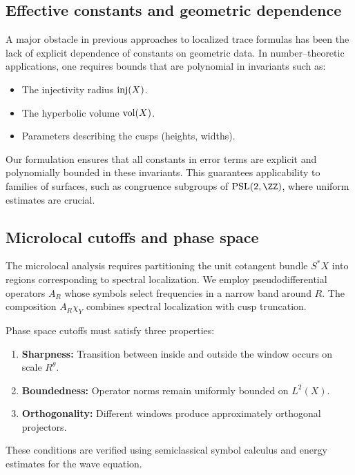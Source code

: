 \subsection{Effective constants and geometric dependence}\label{subsec:constants}

A major obstacle in previous approaches to localized trace formulas has been the lack of explicit dependence of constants on geometric data. In number–theoretic applications, one requires bounds that are polynomial in invariants such as:

\begin{itemize}
  \item The injectivity radius $\mathrm{inj}(X)$.
  \item The hyperbolic volume $\operatorname{vol}(X)$.
  \item Parameters describing the cusps (heights, widths).
\end{itemize}

Our formulation ensures that all constants in error terms are explicit and polynomially bounded in these invariants. This guarantees applicability to families of surfaces, such as congruence subgroups of $\PSL(2,\ZZ)$, where uniform estimates are crucial.

\subsection{Microlocal cutoffs and phase space}\label{subsec:cutoffs}

The microlocal analysis requires partitioning the unit cotangent bundle $S^*X$ into regions corresponding to spectral localization. We employ pseudodifferential operators $A_R$ whose symbols select frequencies in a narrow band around $R$. The composition $A_R \chi_Y$ combines spectral localization with cusp truncation.

Phase space cutoffs must satisfy three properties:

\begin{enumerate}
  \item \textbf{Sharpness:} Transition between inside and outside the window occurs on scale $R^\theta$.
  \item \textbf{Boundedness:} Operator norms remain uniformly bounded on $L^2(X)$.
  \item \textbf{Orthogonality:} Different windows produce approximately orthogonal projectors.
\end{enumerate}

These conditions are verified using semiclassical symbol calculus and energy estimates for the wave equation.

